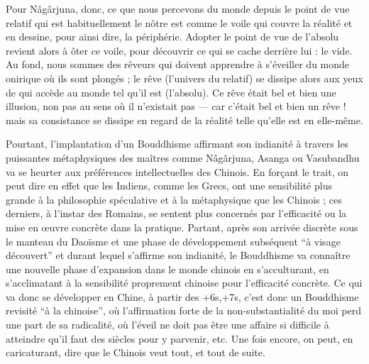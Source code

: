 Pour Nâgârjuna, donc, ce que nous percevons du monde depuis le point de vue relatif
qui est habituellement le nôtre est comme le voile qui couvre la réalité et en dessine,
pour ainsi dire, la périphérie.
Adopter le point de vue de l'absolu revient alors à ôter ce
voile, pour découvrir ce qui se cache derrière lui : le vide.
Au fond, nous sommes des
rêveurs qui doivent apprendre à s'éveiller du monde onirique où ils sont plongés ; le
rêve (l'univers du relatif) se dissipe alors aux yeux de qui accède au monde tel qu'il est
(l'absolu).
Ce rêve était bel et bien une illusion, non pas au sens où il n'existait pas --- car
c'était bel et bien un rêve ! mais sa consistance se dissipe en regard de la réalité telle
qu'elle est en elle-même.

Pourtant, l'implantation d'un Bouddhisme affirmant son indianité à travers les puissantes métaphysiques des maîtres comme Nâgârjuna, Asanga ou Vasubandhu va se heurter
aux préférences intellectuelles des Chinois.
En forçant le trait, on peut dire en effet que
les Indiens, comme les Grecs, ont une sensibilité plus grande à la philosophie spéculative et à la métaphysique que les Chinois ; ces derniers, à l'instar des Romains, se
sentent plus concernés par l'efficacité ou la mise en œuvre concrète dans la pratique.
Partant, après son arrivée discrète sous le manteau du Daoïsme et une phase de développement subséquent ``à visage découvert'' et durant lequel s'affirme son indianité, le
Bouddhisme va connaître une nouvelle phase d'expansion dans le monde chinois en
s'acculturant, en s'acclimatant à la sensibilité proprement chinoise pour l'efficacité
concrète.
Ce qui va donc se développer en Chine, à partir des +6s,+7s, c'est donc un Bouddhisme revisité ``à la chinoise'', où l'affirmation forte de la
non-substantialité du moi perd une part de sa radicalité, où l'éveil ne doit pas être une
affaire si difficile à atteindre qu'il faut des siècles pour y parvenir, etc.
Une fois encore,
on peut, en caricaturant, dire que le Chinois veut tout, et tout de suite.

